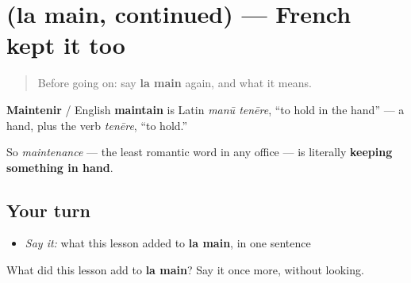 \section[(la main, continued)]{(la main, continued) — French kept it too}

\label{lesson:FR-C17-main-more}



\begin{quote}
Before going on: say \textbf{la main} again, and what it means.
\end{quote}

\begin{cousinweb}
\textbf{Maintenir} / English \textbf{maintain} is Latin \emph{manū tenēre}, \textquotedblleft{}to hold in the hand\textquotedblright{} — a hand, plus the verb \emph{tenēre}, \textquotedblleft{}to hold.\textquotedblright{}

So \emph{maintenance} — the least romantic word in any office — is literally \textbf{keeping something in hand}.
\end{cousinweb}

\subsection*{Your turn}
\begin{itemize}
\raggedright
  \item \emph{Say it:} what this lesson added to \textbf{la main}, in one sentence
\end{itemize}

\begin{tcolorbox}[breakable,colback=teal!4,colframe=teal!35!black,title={Before you move on}]
What did this lesson add to \textbf{la main}? Say it once more, without looking.
\end{tcolorbox}
